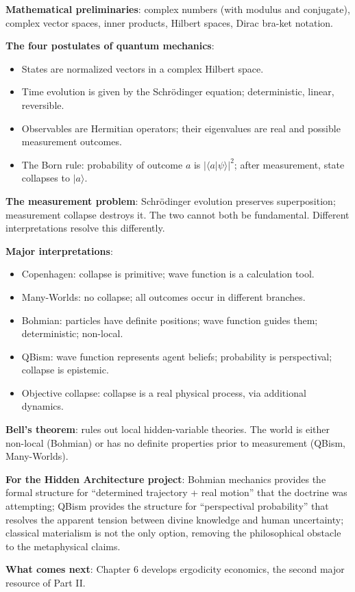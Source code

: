 \begin{summarybox}
\textbf{Mathematical preliminaries}: complex numbers (with modulus
and conjugate), complex vector spaces, inner products, Hilbert
spaces, Dirac bra-ket notation.

\textbf{The four postulates of quantum mechanics}:
\begin{itemize}[leftmargin=1.5em]
    \item States are normalized vectors in a complex Hilbert space.
    \item Time evolution is given by the Schr\"odinger equation;
    deterministic, linear, reversible.
    \item Observables are Hermitian operators; their eigenvalues
    are real and possible measurement outcomes.
    \item The Born rule: probability of outcome $a$ is
    $|\langle a | \psi\rangle|^2$; after measurement, state
    collapses to $|a\rangle$.
\end{itemize}

\textbf{The measurement problem}: Schr\"odinger evolution preserves
superposition; measurement collapse destroys it. The two cannot
both be fundamental. Different interpretations resolve this
differently.

\textbf{Major interpretations}:
\begin{itemize}[leftmargin=1.5em]
    \item Copenhagen: collapse is primitive; wave function is a
    calculation tool.
    \item Many-Worlds: no collapse; all outcomes occur in
    different branches.
    \item Bohmian: particles have definite positions; wave function
    guides them; deterministic; non-local.
    \item QBism: wave function represents agent beliefs; probability
    is perspectival; collapse is epistemic.
    \item Objective collapse: collapse is a real physical process,
    via additional dynamics.
\end{itemize}

\textbf{Bell's theorem}: rules out local hidden-variable theories.
The world is either non-local (Bohmian) or has no definite
properties prior to measurement (QBism, Many-Worlds).

\textbf{For the Hidden Architecture project}: Bohmian mechanics
provides the formal structure for ``determined trajectory + real
motion'' that the  doctrine was attempting; QBism
provides the structure for ``perspectival probability'' that
resolves the apparent tension between divine knowledge and human
uncertainty; classical materialism is not the only option, removing
the philosophical obstacle to the metaphysical claims.

\textbf{What comes next}: Chapter 6 develops ergodicity economics,
the second major resource of Part II.
\end{summarybox}

\cleardoublepage
